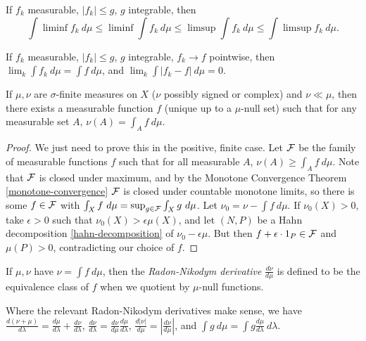 \documentclass[letterpaper,11pt]{report}
\begin{document}
\begin{cor} If $f_k$ measurable, $|f_k| \le g$, $g$ integrable, then
\[
\int \liminf f_k\ d\mu \le \liminf \int f_k\ d\mu \le \limsup \int f_k\ d\mu \le \int \limsup f_k\ d\mu.
\]
\end{cor}

\begin{thm}\label{dominated-convergence} If $f_k$ measurable, $|f_k| \le g$, $g$ integrable, $f_k \rightarrow f$ pointwise, then $\lim_k \int f_k\ d\mu = \int f\ d\mu$, and $\lim_k \int |f_k - f|\ d\mu = 0$.
\end{thm}

\begin{thm}\label{radon-nikodym} If $\mu, \nu$ are $\sigma$-finite measures on $X$ ($\nu$ possibly signed or complex) and $\nu \ll \mu$, then there exists a measurable function $f$ (unique up to a $\mu$-null set) such that for any measurable set $A$, $\nu(A) = \int_A f\ d\mu$.
\end{thm}
\begin{proof} We just need to prove this in the positive, finite case. Let $\mathcal{F}$ be the family of measurable functions $f$ such that for all measurable $A$, $\nu(A) \ge \int_A f\ d\mu$. Note that $\mathcal{F}$ is closed under maximum, and by the Monotone Convergence Theorem \ref{monotone-convergence} $\mathcal{F}$ is closed under countable monotone limits, so there is some $f \in \mathcal{F}$ with $\int_X f\ d\mu = \sup_{g \in \mathcal{F}} \int_X g\ d\mu$. Let $\nu_0 = \nu - \int f\ d\mu$. If $\nu_0(X) > 0$, take $\epsilon > 0$ such that $\nu_0(X) > \epsilon \mu(X)$, and let $(N,P)$ be a Hahn decomposition \ref{hahn-decomposition} of $\nu_0 - \epsilon \mu$. But then $f + \epsilon\cdot 1_P \in \mathcal{F}$ and $\mu(P) > 0$, contradicting our choice of $f$.
\end{proof}

\begin{defn} If $\mu, \nu$ have $\nu = \int f\ d\mu$, then the \emph{Radon-Nikodym derivative} $\frac{d\nu}{d\mu}$ is defined to be the equivalence class of $f$ when we quotient by $\mu$-null functions.
\end{defn}

\begin{prop} Where the relevant Radon-Nikodym derivatives make sense, we have $\frac{d(\nu+\mu)}{d\lambda} = \frac{d\mu}{d\lambda} + \frac{d\nu}{d\lambda}$, $\frac{d\nu}{d\lambda} = \frac{d\nu}{d\mu} \frac{d\mu}{d\lambda}$, $\frac{d|\nu|}{d\mu} = |\frac{d\nu}{d\mu}|$, and $\int g\ d\mu = \int g\frac{d\mu}{d\lambda}\ d\lambda$.
\end{prop}
\end{document}

